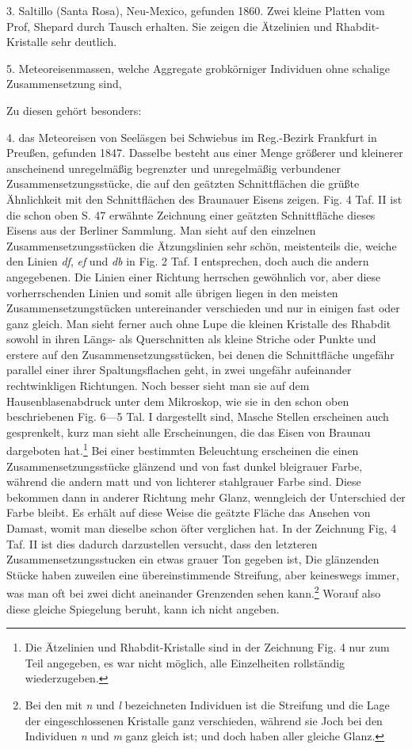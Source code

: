 \documentclass[a4paper, 11pt, oneside]{article}
\begin{document}
3. Saltillo (Santa Rosa), Neu-Mexico, gefunden 1860. Zwei kleine Platten vom Prof, Shepard durch Tausch erhalten. Sie zeigen die Ätzelinien und Rhabdit-Kristalle sehr deutlich.

5. Meteoreisenmassen, welche Aggregate grobkörniger Individuen ohne schalige Zusammensetzung sind,

Zu diesen gehört besonders:

4. das Meteoreisen von Seeläsgen bei Schwiebus im Reg.-Bezirk Frankfurt in Preußen, gefunden 1847. Dasselbe besteht aus einer Menge größerer und kleinerer anscheinend unregelmäßig begrenzter und unregelmäßig verbundener Zusammensetzungsstücke, die auf den geätzten Schnittflächen die grüßte Ähnlichkeit mit den Schnittflächen des Braunauer Eisens zeigen. Fig. 4 Taf. II ist die schon oben S. 47 erwähnte Zeichnung einer geätzten Schnittfläche dieses Eisens aus der Berliner Sammlung. Man sieht auf den einzelnen Zusammensetzungsstücken die Ätzungslinien sehr schön, meistenteils die, weiche den Linien \emph{df}, \emph{ef} und \emph{db} in Fig. 2 Taf. I entsprechen, doch auch die andern angegebenen. Die Linien einer Richtung herrschen gewöhnlich vor, aber diese vorherrschenden Linien und somit alle übrigen liegen in den meisten Zusammensetzungstücken untereinander verschieden und nur in einigen fast oder ganz gleich. Man sieht ferner auch ohne Lupe die kleinen Kristalle des Rhabdit sowohl in ihren Längs- als Querschnitten als kleine Striche oder Punkte und erstere auf den Zusammensetzungsstücken, bei denen die Schnittfläche ungefähr parallel einer ihrer Spaltungsflachen geht, in zwei ungefähr aufeinander rechtwinkligen Richtungen. Noch besser sieht man sie auf dem Hausenblasenabdruck unter dem Mikroskop, wie sie in den schon oben beschriebenen Fig. 6—5 Tal. I dargestellt sind, Masche Stellen erscheinen auch gesprenkelt, kurz man sieht alle Erscheinungen, die das Eisen von Braunau dargeboten hat.\footnote{Die Ätzelinien und Rhabdit-Kristalle sind in der Zeichnung Fig. 4 nur zum Teil angegeben, es war nicht möglich, alle Einzelheiten rollständig wiederzugeben.} Bei einer bestimmten Beleuchtung erscheinen die einen Zusammensetzungsstücke glänzend und von fast dunkel bleigrauer Farbe, während die andern matt und von lichterer stahlgrauer Farbe sind. Diese bekommen dann in anderer Richtung mehr Glanz, wenngleich der Unterschied der Farbe bleibt. Es erhält auf diese Weise die geätzte Fläche das Ansehen von Damast, womit man dieselbe schon öfter verglichen hat. In der Zeichnung Fig, 4 Taf. II ist dies dadurch darzustellen versucht, dass den letzteren Zusammensetzungsstucken ein etwas grauer Ton gegeben ist, Die glänzenden Stücke haben zuweilen eine übereinstimmende Streifung, aber keineswegs immer, was man oft bei zwei dicht aneinander Grenzenden sehen kann.\footnote{Bei den mit \emph{n} und \emph{l} bezeichneten Individuen ist die Streifung und die Lage der eingeschlossenen Kristalle ganz verschieden, während sie Joch bei den Individuen \emph{n} und \emph{m} ganz gleich ist; und doch haben aller gleiche Glanz.} Worauf also diese gleiche Spiegelung beruht, kann ich nicht angeben.
\end{document}
